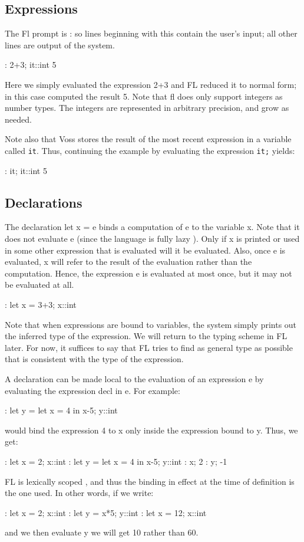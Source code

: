 \subsection{Expressions}
The Fl prompt%
%
{} is : so lines beginning with this contain
the user's input; all other lines are output of the system.
\begin{hol}
: 2+3;
it::int
5
\end{hol}
Here we simply evaluated the expression 2+3 and FL reduced
it to normal form; in this case computed the result 5. Note that
fl does only support integers%
%
{} as number types.
The integers are represented in arbitrary precision, and grow as needed.

Note also that Voss stores the result of the most recent expression
in a variable called {\tt it}.
%
Thus, continuing the example by evaluating the expression {\tt it;} yields:
\begin{hol}
: it;
it::int
5
\end{hol}

\subsection{Declarations}

The declaration%
%
{} let x = e binds a computation of e to
the variable x.
Note that it does not evaluate e (since the language is fully lazy%
%
{}).
Only if x is printed or used in some other expression that is evaluated
will it be evaluated.
Also, once e is evaluated, x will refer to the result of the evaluation
rather than the computation.
Hence, the expression e is evaluated at most once, but it may
not be evaluated at all.
\begin{hol}
: let x = 3+3;
x::int
\end{hol}
Note that when expressions are bound to variables, the system simply
prints out the inferred type%
%
{} of the expression. We will return to
the typing scheme in FL later.
For now, it suffices to say that FL tries to find as general type as
possible that is consistent with the type of the expression.

A declaration%
%
{} can be made local to the evaluation of an expression
e by evaluating the expression decl in e.
For example:
\begin{hol}
: let y = let x = 4 in x-5;
y::int
\end{hol}
would bind the expression 4 to x only inside the expression
bound to y. Thus, we get:
\begin{hol}
: let x = 2;
x::int
: let y = let x = 4 in x-5;
y::int
: x;
2
: y;
-1
\end{hol}
FL is lexically scoped%
%
{}, and thus
the binding in effect at the time of definition is the one used.
In other words, if we write:
\begin{hol}
: let x = 2;
x::int
: let y = x*5;
y::int
: let x = 12;
x::int
\end{hol}
and we then evaluate y we will get 10
rather than 60.

